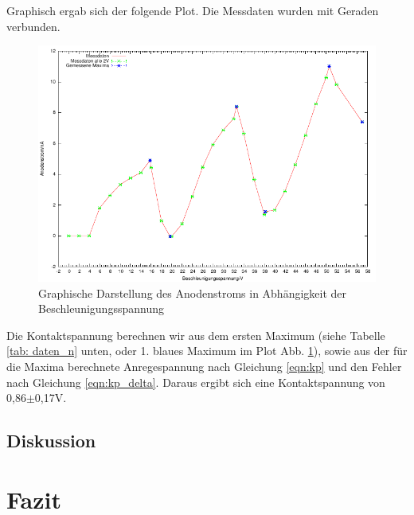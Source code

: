 \documentclass[12pt,a4paper]{article}
\begin{document}
Graphisch ergab sich der folgende Plot. Die Messdaten wurden mit Geraden verbunden.
\begin{figure}[H]
	\centering
	\includegraphics[scale= 1.5]{n_m.pdf}
	\caption{Graphische Darstellung des Anodenstroms in Abhängigkeit der Beschleunigungsspannung}
	\label{fig:plot_n}
\end{figure}
Die Kontaktspannung berechnen wir aus dem ersten Maximum (siehe Tabelle \ref{tab: daten_n} unten, oder 1. blaues Maximum im Plot Abb. \ref{fig:plot_n}), sowie aus der für die Maxima berechnete Anregespannung nach Gleichung \ref{eqn:kp} und den Fehler nach Gleichung \ref{eqn:kp_delta}.
Daraus ergibt sich eine Kontaktspannung von 0,86$\pm$0,17V.

\subsection{Diskussion}
\section{Fazit}
\end{document}
